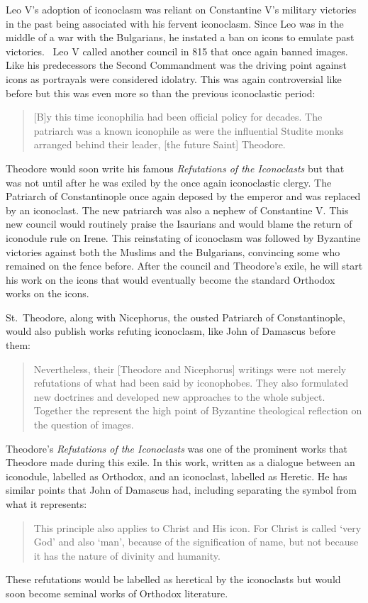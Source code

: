 \documentclass[12pt]{article}
\begin{document}
    Leo V's adoption of iconoclasm was reliant on Constantine V's military victories in the past being associated with his fervent iconoclasm. Since Leo was in the middle of a war with the Bulgarians, he instated a ban on icons to emulate past victories.~\cite[p. 130]{IconIdolatry} Leo V called another council in 815 that once again banned images. Like his predecessors the Second Commandment was the driving point against icons as portrayals were considered idolatry. This was again controversial like before but this was even more so than the previous iconoclastic period: \begin{quote}
        [B]y this time iconophilia had been official policy for decades. The patriarch was a known iconophile as were the influential Studite monks arranged behind their leader, [the future Saint] Theodore.~\cite[p. 247]{Noble6}
    \end{quote}\noindent
    Theodore would soon write his famous \emph{Refutations of the Iconoclasts} but that was not until after he was exiled by the once again iconoclastic clergy. The Patriarch of Constantinople once again deposed by the emperor and was replaced by an iconoclast. The new patriarch was also a nephew of Constantine V. This new council would routinely praise the Isaurians and would blame the return of iconodule rule on Irene. This reinstating of iconoclasm was followed by Byzantine victories against both the Muslims and the Bulgarians, convincing some who remained on the fence before. After the council and Theodore's exile, he will start his work on the icons that would eventually become the standard Orthodox works on the icons. \

    St.\ Theodore, along with Nicephorus, the ousted Patriarch of Constantinople, would also publish works refuting iconoclasm, like John of Damascus before them: \begin{quote}
        Nevertheless, their [Theodore and Nicephorus] writings were not merely refutations of what had been said by iconophobes. They also formulated new doctrines and developed new approaches to the whole subject. Together the represent the high point of Byzantine theological reflection on the question of images.~\cite[p. 252]{Noble6}
    \end{quote}\noindent
    Theodore's \emph{Refutations of the Iconoclasts} was one of the prominent works that Theodore made during this exile. In this work, written as a dialogue between an iconodule, labelled as Orthodox, and an iconoclast, labelled as Heretic. He has similar points that John of Damascus had, including separating the symbol from what it represents: \begin{quote}
        This principle also applies to Christ and His icon. For Christ is called `very God' and also `man', because of the signification of name, but not because it has the nature of divinity and humanity.~\cite[p. 52]{OntheIcons}
    \end{quote}\noindent
    These refutations would be labelled as heretical by the iconoclasts but would soon become seminal works of Orthodox literature. \
\end{document}
